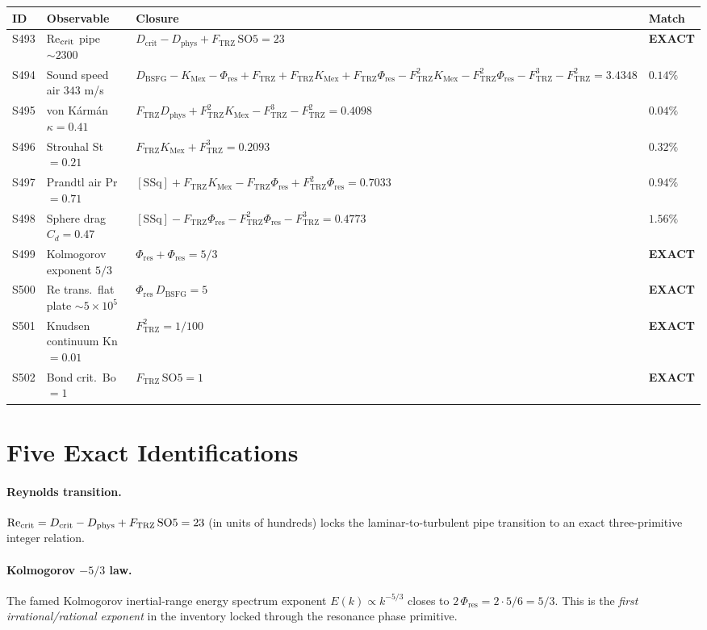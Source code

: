 \documentclass[11pt]{article}
\newcommand{\Ftrz}{F_{\mathrm{TRZ}}}
\newcommand{\Phires}{\Phi_{\mathrm{res}}}
\newcommand{\KMex}{K_{\mathrm{Mex}}}
\newcommand{\Dphys}{D_{\mathrm{phys}}}
\newcommand{\Dbsfg}{D_{\mathrm{BSFG}}}
\newcommand{\Dcrit}{D_{\mathrm{crit}}}
\newcommand{\SOfive}{\mathrm{SO5}}
\newcommand{\SSq}{[\mathrm{SSq}]}
\begin{document}
\begin{longtable}{@{}llll@{}}
\toprule
ID & Observable & Closure & Match \\
\midrule
\endhead
S493 & Re$_{\rm crit}$ pipe $\sim 2300$ & $\Dcrit-\Dphys+\Ftrz\,\SOfive=23$ & \textbf{EXACT} \\
S494 & Sound speed air $343$ m/s & $\Dbsfg-\KMex-\Phires+\Ftrz+\Ftrz\KMex+\Ftrz\Phires-\Ftrz^2\KMex-\Ftrz^2\Phires-\Ftrz^3-\Ftrz^2=3.4348$ & $0.14\%$ \\
S495 & von K\'arm\'an $\kappa=0.41$ & $\Ftrz\Dphys+\Ftrz^2\KMex-\Ftrz^3-\Ftrz^2=0.4098$ & $0.04\%$ \\
S496 & Strouhal St $=0.21$ & $\Ftrz\KMex+\Ftrz^3=0.2093$ & $0.32\%$ \\
S497 & Prandtl air Pr $=0.71$ & $\SSq+\Ftrz\KMex-\Ftrz\Phires+\Ftrz^2\Phires=0.7033$ & $0.94\%$ \\
S498 & Sphere drag $C_d=0.47$ & $\SSq-\Ftrz\Phires-\Ftrz^2\Phires-\Ftrz^3=0.4773$ & $1.56\%$ \\
S499 & Kolmogorov exponent $5/3$ & $\Phires+\Phires=5/3$ & \textbf{EXACT} \\
S500 & Re trans.\ flat plate $\sim 5\times10^5$ & $\Phires\,\Dbsfg=5$ & \textbf{EXACT} \\
S501 & Knudsen continuum Kn$=0.01$ & $\Ftrz^2=1/100$ & \textbf{EXACT} \\
S502 & Bond crit.\ Bo $=1$ & $\Ftrz\,\SOfive=1$ & \textbf{EXACT} \\
\bottomrule
\end{longtable}

\section{Five Exact Identifications}

\paragraph{Reynolds transition.}
$\mathrm{Re}_{\rm crit} = \Dcrit - \Dphys + \Ftrz\,\SOfive = 23$ (in units of
hundreds) locks the laminar-to-turbulent pipe transition to an exact
three-primitive integer relation.

\paragraph{Kolmogorov $-5/3$ law.}
The famed Kolmogorov inertial-range energy spectrum exponent
$E(k) \propto k^{-5/3}$ closes to $2\,\Phires = 2\cdot 5/6 = 5/3$. This is the
\emph{first irrational/rational exponent} in the inventory locked through
the resonance phase primitive.
\end{document}
